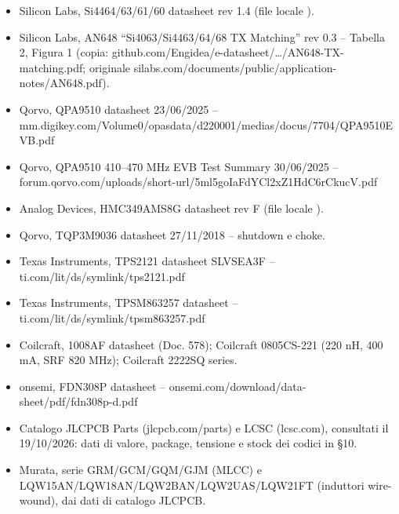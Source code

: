 \begin{itemize}
\raggedright
\item Silicon Labs, Si4464/\allowbreak{}63/\allowbreak{}61/\allowbreak{}60 datasheet rev 1.4 (file locale ).
\item Silicon Labs, AN648 \textquotedblleft{}Si4063/\allowbreak{}Si4463/\allowbreak{}64/\allowbreak{}68 TX Matching\textquotedblright{} rev 0.3 – Tabella 2, Figura 1 (copia: github.com/\allowbreak{}Engidea/\allowbreak{}e-datasheet/\allowbreak{}…/\allowbreak{}AN648-TX-matching.pdf; originale silabs.com/\allowbreak{}documents/\allowbreak{}public/\allowbreak{}application-notes/\allowbreak{}AN648.pdf).
\item Qorvo, QPA9510 datasheet 23/\allowbreak{}06/\allowbreak{}2025 – mm.digikey.com/\allowbreak{}Volume0/\allowbreak{}opasdata/\allowbreak{}d220001/\allowbreak{}medias/\allowbreak{}docus/\allowbreak{}7704/\allowbreak{}QPA9510EVB.pdf
\item Qorvo, QPA9510 410–470 MHz EVB Test Summary 30/\allowbreak{}06/\allowbreak{}2025 – forum.qorvo.com/\allowbreak{}uploads/\allowbreak{}short-url/\allowbreak{}5ml5goIaFdYCl2xZ1HdC6rCkucV.pdf
\item Analog Devices, HMC349AMS8G datasheet rev F (file locale ).
\item Qorvo, TQP3M9036 datasheet 27/\allowbreak{}11/\allowbreak{}2018 – shutdown e choke.
\item Texas Instruments, TPS2121 datasheet SLVSEA3F – ti.com/\allowbreak{}lit/\allowbreak{}ds/\allowbreak{}symlink/\allowbreak{}tps2121.pdf
\item Texas Instruments, TPSM863257 datasheet – ti.com/\allowbreak{}lit/\allowbreak{}ds/\allowbreak{}symlink/\allowbreak{}tpsm863257.pdf
\item Coilcraft, 1008AF datasheet (Doc. 578); Coilcraft 0805CS-221 (220 nH, 400 mA, SRF 820 MHz); Coilcraft 2222SQ series.
\item onsemi, FDN308P datasheet – onsemi.com/\allowbreak{}download/\allowbreak{}data-sheet/\allowbreak{}pdf/\allowbreak{}fdn308p-d.pdf
\item Catalogo JLCPCB Parts (jlcpcb.com/\allowbreak{}parts) e LCSC (lcsc.com), consultati il 19/\allowbreak{}10/\allowbreak{}2026: dati di valore, package, tensione e stock dei codici in §10.
\item Murata, serie GRM/\allowbreak{}GCM/\allowbreak{}GQM/\allowbreak{}GJM (MLCC) e LQW15AN/\allowbreak{}LQW18AN/\allowbreak{}LQW2BAN/\allowbreak{}LQW2UAS/\allowbreak{}LQW21FT (induttori wire-wound), dai dati di catalogo JLCPCB.
\end{itemize}
